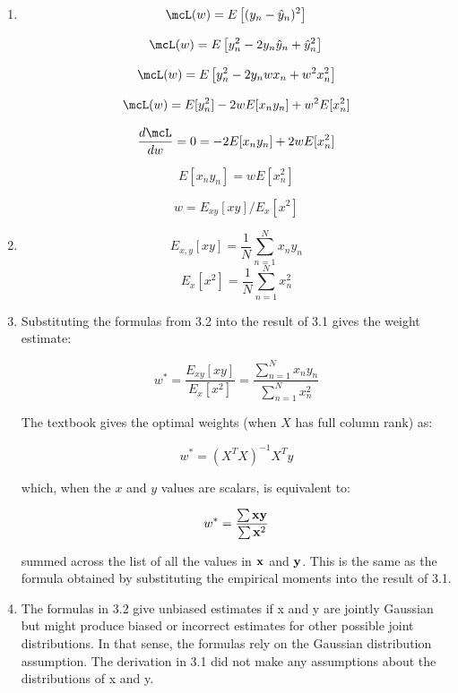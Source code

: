 \documentclass[submit]{harvardml}
\begin{document}
\begin{enumerate}
    \item
    
    $$\mcL(w) = E\left[(y_n - \hat{y}_n)^2\right]$$
    
    $$\mcL(w) = E\left[y_n^2 - 2y_n\hat{y}_n + \hat{y}_n^2\right]$$
    
    $$\mcL(w) = E\left[y_n^2 - 2y_n w x_n + w^2 x_n^2\right]$$
    
    $$\mcL(w) = E[y_n^2] - 2 w E[x_n y_n] + w^2 E[x_n^2]$$
    
    $$ \frac{d\mcL}{dw} = 0 = -2E[x_n y_n] + 2w E[x_n^2]$$
    
    $$ E[x_n y_n] = w E[x_n^2] $$
    
    $$ w = E_{xy}[x y] / E_{x}[x^2] $$
    
    \item $$E_{x, y}[xy] = \frac{1}{N} \sum_{n=1}^{N} x_n y_n$$
    $$E_{x}[x^2] = \frac{1}{N} \sum_{n=1}^{N} x_n^2$$
    
    \item
    Substituting the formulas from 3.2 into the result of 3.1 gives the weight estimate:
  
  $$ w^* = \frac{E_{xy}[x y]}{E_{x}[x^2]} = \frac{\sum_{n=1}^{N} x_n y_n}{\sum_{n=1}^{N} x_n^2} $$
  
  The textbook gives the optimal weights (when $X$ has full column rank) as:
  
  $$ w^* = (X^T X)^{-1} X^T y $$
  
  which, when the $x$ and $y$ values are scalars, is equivalent to:
  
  $$ w^* = \frac{\sum \bold{x}\bold{y}}{\sum \bold{x}^2} $$
  
  summed across the list of all the values in $\bold{x}$ and $\bold{y}$. This is the same as the formula obtained by substituting the empirical moments into the result of 3.1.
  
  \item The formulas in 3.2 give unbiased estimates if x and y are jointly Gaussian but might produce biased or incorrect estimates for other possible joint distributions. In that sense, the formulas rely on the Gaussian distribution assumption. The derivation in 3.1 did not make any assumptions about the distributions of x and y.
 
 
\end{enumerate}


\end{document}
